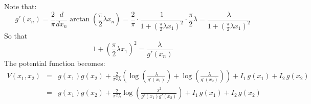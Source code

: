 Note that:
\begin{equation*}
g'(x_n) = \frac{2}{\pi} \dfrac{d}{d x_n} 
                        \arctan\left( \frac{\pi}{2} \lambda x_n \right)
= \frac{2}{\pi} \cdot
\frac{1}{1+ \left(\displaystyle{\frac{\pi}{2}}\lambda x_1\right)^2 }
\cdot \frac{\pi}{2} \lambda
= \frac{\lambda}{1+ \left(\displaystyle{\frac{\pi}{2}}\lambda x_1\right)^2 } 
\end{equation*}
So that
\begin{equation*}
1+ \left(\displaystyle{\frac{\pi}{2}}\lambda x_1\right)^2 = 
\frac{\lambda}{g'(x_n)}
\end{equation*}
The potential function becomes:
\begin{eqnarray*}
V(x_1, x_2) &=& g(x_1) g(x_2) + 
\frac{2}{\pi^2\lambda} \left(
\log\left( \frac{\lambda}{g'(x_1)} \right)
+
\log\left( \frac{\lambda}{g'(x_2)} \right) \right)
+ I_1 \, g(x_1) + I_2 \, g(x_2)  \\
~  &=& g(x_1) g(x_2) + 
\frac{2}{\pi^2\lambda} 
\log\left( \frac{\lambda^2}{g'(x_1) g'(x_2)} \right)
+ I_1 \, g(x_1) + I_2 \, g(x_2)  
\end{eqnarray*}

